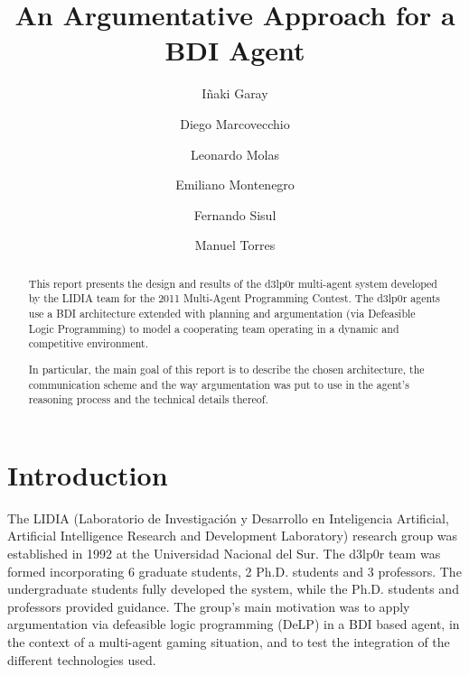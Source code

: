 \documentclass{llncs2e/llncs}
\title{An Argumentative Approach for a BDI Agent} %
\author{I\~{n}aki Garay \and 
        Diego Marcovecchio \and
        Leonardo Molas \and
        Emiliano Montenegro \and
        Fernando Sisul \and
        Manuel Torres
        }
\institute{Universidad Nacional del Sur}
\begin{document}
\frontmatter %

\maketitle

\begin{comment}
\pagestyle{headings}  %
\addtocmark{Hamiltonian Mechanics} %
figuras
- la arquitectura del agente
- la arquitectura del programa
- ejemplo del fog of war y coloreo
meter una buena explicacion de la arquitectura bdi en la parte de diseño

- arquitectura
- argumentacion
- estrategias
- percept server
\end{comment}

\begin{abstract}
    This report presents the design and results of the d3lp0r multi-agent system 
    developed by the LIDIA team for the 2011 Multi-Agent Programming Contest.
    The d3lp0r agents use a BDI architecture extended with planning and 
    argumentation (via Defeasible Logic Programming) to model a cooperating team 
    operating in a dynamic and competitive environment.

    In particular, the main goal of this report is to describe the chosen 
    architecture, the communication scheme and the way argumentation was put to 
    use in the agent's reasoning process and the technical details thereof.
\end{abstract}

\section{Introduction}

    The LIDIA (Laboratorio de Investigación y Desarrollo en Inteligencia 
    Artificial, Artificial Intelligence Research and Development Laboratory) 
    research group was established in 1992 at the Universidad Nacional del Sur. 
    The d3lp0r team was formed incorporating 6 graduate students, 2 Ph.D. students 
    and 3 professors. The undergraduate students fully developed the system, while 
    the Ph.D. students and professors provided guidance. The group's main 
    motivation was to apply argumentation via defeasible logic programming (DeLP) 
    in a BDI based agent, in the context of a multi-agent gaming situation, and to 
    test the integration of the different technologies used.
\end{document}
